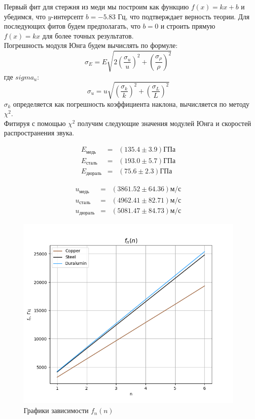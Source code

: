 \documentclass[a4paper,12pt]{article}
\begin{document}
	Первый фит для стержня из меди мы построим как функцию $f(x)=kx+b$ и убедимся, что $y$-интерсепт $b=-5.83$ Гц, что подтверждает верность теории. Для последующих фитов будем предполагать, что $b=0$ и строить прямую $f(x)=kx$ для более точных результатов.\\
	
	Погрешность модуля Юнга будем вычислять по формуле:
	\begin{equation}
		\label{Eerr}
		\sigma_E=E\sqrt{2\left(\frac{\sigma_u}{u}\right)^2+\left(\frac{\sigma_\rho}{\rho}\right)^2}
	\end{equation}
	где $sigma_u$:
	\begin{equation}
		\label{uerr}
		\sigma_u=u\sqrt{\left(\frac{\sigma_k}{k}\right)^2+\left(\frac{\sigma_L}{L}\right)^2}
	\end{equation}
	$\sigma_k$ определяется как погрешность коэффициента наклона, вычисляется по методу $\chi^2$.\\
	
	Фитируя с помощью $\chi^2$ получим следующие значения модулей Юнга и скоростей распространения звука.
	
	\begin{eqnarray}
		E_\text{медь}&=&(135.4\pm 3.9)\text{ГПа}\\
		E_\text{сталь}&=&(193.0\pm 5.7)\text{ГПа}\\
		E_\text{дюраль}&=&(75.6\pm 2.3)\text{ГПа}
	\end{eqnarray}
	
	\begin{eqnarray}
		u_\text{медь}&=&(3861.52\pm 64.36) \text{м}/\text{с}\\
		u_\text{сталь}&=&(4962.41\pm 82.71) \text{м}/\text{с}\\
		u_\text{дюраль}&=&(5081.47\pm 84.73) \text{м}/\text{с}
	\end{eqnarray}
	
	\begin{figure}[H]
		\centering
		\includegraphics[width=0.9\linewidth]{fig3}
		\caption{Графики зависимости $f_n(n)$}
		\label{fig:fig3}
	\end{figure}
	
\end{document}
